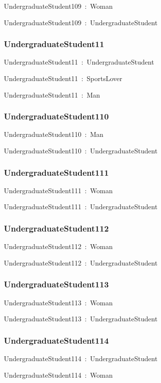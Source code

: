 \documentclass{article}
\begin{document}
UndergraduateStudent109~:~Woman

UndergraduateStudent109~:~UndergraduateStudent

\subsubsection*{UndergraduateStudent11}

UndergraduateStudent11~:~UndergraduateStudent

UndergraduateStudent11~:~SportsLover

UndergraduateStudent11~:~Man

\subsubsection*{UndergraduateStudent110}

UndergraduateStudent110~:~Man

UndergraduateStudent110~:~UndergraduateStudent

\subsubsection*{UndergraduateStudent111}

UndergraduateStudent111~:~Woman

UndergraduateStudent111~:~UndergraduateStudent

\subsubsection*{UndergraduateStudent112}

UndergraduateStudent112~:~Woman

UndergraduateStudent112~:~UndergraduateStudent

\subsubsection*{UndergraduateStudent113}

UndergraduateStudent113~:~Woman

UndergraduateStudent113~:~UndergraduateStudent

\subsubsection*{UndergraduateStudent114}

UndergraduateStudent114~:~UndergraduateStudent

UndergraduateStudent114~:~Woman
\end{document}
